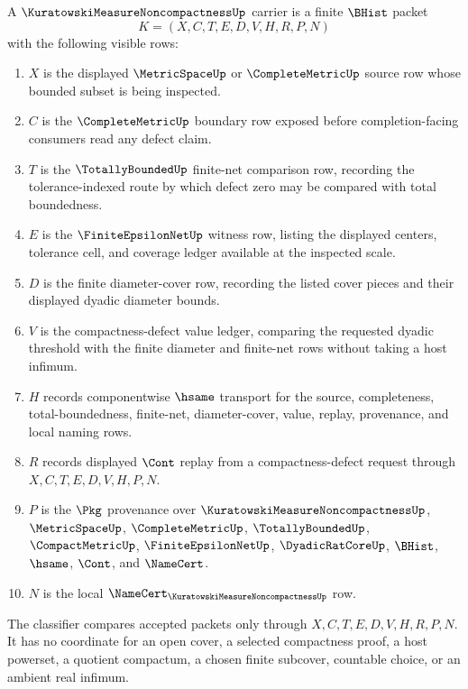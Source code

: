 \begin{definition}
\label{def:kuratowski-measure-noncompactness-carrier}
A $\KuratowskiMeasureNoncompactnessUp$ carrier is a finite $\BHist$ packet
$$
K=(X,C,T,E,D,V,H,R,P,N)
$$
with the following visible rows:
\begin{enumerate}
\item $X$ is the displayed $\MetricSpaceUp$ or $\CompleteMetricUp$ source row whose bounded subset is being inspected.
\item $C$ is the $\CompleteMetricUp$ boundary row exposed before completion-facing consumers read any defect claim.
\item $T$ is the $\TotallyBoundedUp$ finite-net comparison row, recording the tolerance-indexed route by which defect zero may be compared with total boundedness.
\item $E$ is the $\FiniteEpsilonNetUp$ witness row, listing the displayed centers, tolerance cell, and coverage ledger available at the inspected scale.
\item $D$ is the finite diameter-cover row, recording the listed cover pieces and their displayed dyadic diameter bounds.
\item $V$ is the compactness-defect value ledger, comparing the requested dyadic threshold with the finite diameter and finite-net rows without taking a host infimum.
\item $H$ records componentwise $\hsame$ transport for the source, completeness, total-boundedness, finite-net, diameter-cover, value, replay, provenance, and local naming rows.
\item $R$ records displayed $\Cont$ replay from a compactness-defect request through $X,C,T,E,D,V,H,P,N$.
\item $P$ is the $\Pkg$ provenance over $\KuratowskiMeasureNoncompactnessUp$, $\MetricSpaceUp$, $\CompleteMetricUp$, $\TotallyBoundedUp$, $\CompactMetricUp$, $\FiniteEpsilonNetUp$, $\DyadicRatCoreUp$, $\BHist$, $\hsame$, $\Cont$, and $\NameCert$.
\item $N$ is the local $\NameCert_{\KuratowskiMeasureNoncompactnessUp}$ row.
\end{enumerate}
The classifier compares accepted packets only through $X,C,T,E,D,V,H,R,P,N$. It has no coordinate for an open cover, a selected compactness proof, a host powerset, a quotient compactum, a chosen finite subcover, countable choice, or an ambient real infimum.
\end{definition}

